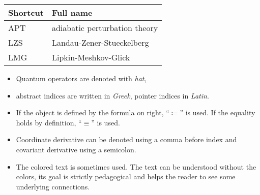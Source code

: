 \begin{tabular} {@{}C{4cm}@{}p{9.67cm}}
	\toprule
	\textbf{Shortcut}& \textbf{Full name}\\\bottomrule
	
	APT & adiabatic perturbation theory \\
	LZS & Landau-Zener-Stueckelberg\\
	LMG & Lipkin-Meshkov-Glick \\
	\bottomrule
\end{tabular}


\begin{itemize}
    \item Quantum operators are denoted with \emph{hat}, 
    \item abstract indices are written in \emph{Greek}, pointer indices in \emph{Latin}. 
    \item If the object is defined by the formula on right, “$\coloneqq$” is used. If the equality holds by definition, “$\equiv$” is used. 
    \item Coordinate derivative can be denoted using a comma before index and covariant derivative using a semicolon. 
    \item The colored text is sometimes used. The text can be understood without the colors, its goal is strictly pedagogical and helps the reader to see some underlying connections.
\end{itemize}